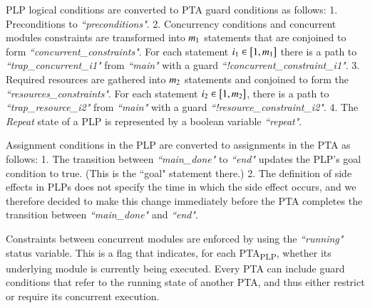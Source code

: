 \documentclass[letterpaper]{article}
\newcommand\aNote[1]{\todo[inline, author=Alex, color=GreenYellow]{#1}}
\begin{document}
\par PLP logical conditions are converted to PTA guard conditions
as follows: 1. Preconditions to \textit{``preconditions"}. 2. Concurrency conditions and concurrent modules constraints are transformed into $m\textsubscript{1}$ statements that are conjoined to form \textit{``concurrent\_constraints"}. For each statement $i\textsubscript{1} \in \big[ 1, m\textsubscript{1} \big]$ there is a path to \textit{``trap\_concurrent\_i1"} from \textit{``main"} with a guard \textit{``!concurrent\_constraint\_i1"}. 
%
3. Required resources are gathered into $m\textsubscript{2}$ statements and conjoined to form the \textit{``resources\_constraints"}. For each statement $i\textsubscript{2} \in \big[ 1, m\textsubscript{2} \big]$, there is a path to \textit{``trap\_resource\_i2"} from \textit{``main"} with a guard \textit{``!resource\_constraint\_i2"}. 4. The \textit{Repeat} state of a PLP is represented by a boolean variable \textit{``repeat"}. 
\par Assignment conditions in the PLP are converted to assignments in the PTA as follows: 1. 
The transition between \textit{``main\_done"} to \textit{``end"} updates the
PLP's goal condition to true. (This is the ``goal" statement there.)
2. The definition of side effects in PLPs does not specify the time in which the side effect occurs,
and we therefore decided to make this change immediately before the PTA 
completes the transition between  \textit{``main\_done"} and \textit{``end"}.
\par Constraints between concurrent modules are enforced by using
the \textit{``running"} status variable. This is a flag that indicates, for each PTA\textsubscript{PLP}, whether its underlying module is currently being executed.
Every PTA can include guard conditions that refer
to the running state of another PTA, and thus either restrict or
require its concurrent execution.
\end{document}

